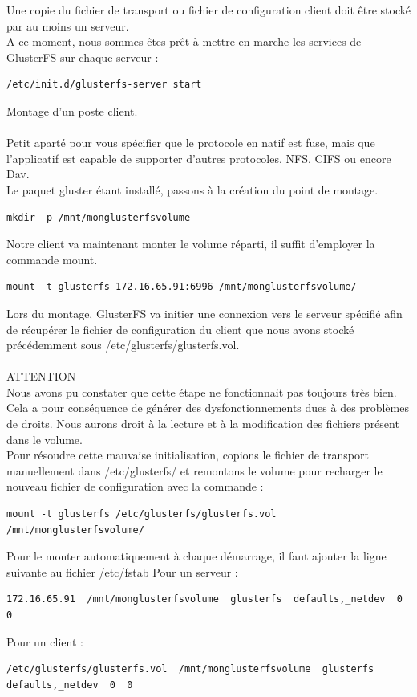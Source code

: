 \documentclass[12pt]{report}
\begin{document}
Une copie du fichier de transport ou fichier de configuration client doit être stocké par au moins un serveur.\\
A ce moment, nous sommes êtes prêt à mettre en marche les services de GlusterFS sur chaque serveur :
\begin{lstlisting}
/etc/init.d/glusterfs-server start
	  \end{lstlisting}
Montage d'un poste client.\\\\
Petit aparté pour vous spécifier que le protocole en natif est fuse, mais que l'applicatif est capable de supporter d'autres protocoles, NFS, CIFS ou encore Dav.\\
Le paquet gluster étant installé, passons à la création du point de montage.
\begin{lstlisting}
mkdir -p /mnt/monglusterfsvolume
	  \end{lstlisting}
Notre client va maintenant monter le volume réparti, il suffit d'employer la commande mount.
\begin{lstlisting}
mount -t glusterfs 172.16.65.91:6996 /mnt/monglusterfsvolume/
	  \end{lstlisting}
Lors du montage, GlusterFS va initier une connexion vers le serveur spécifié afin de récupérer le fichier de configuration du client que nous avons stocké précédemment sous /etc/glusterfs/glusterfs.vol.\\\\
ATTENTION\\
Nous avons pu constater que cette étape ne fonctionnait pas toujours très bien. Cela a pour conséquence de générer des dysfonctionnements dues à des problèmes de droits. Nous aurons droit à la lecture et à la modification des fichiers présent dans le volume.\\
Pour résoudre cette mauvaise initialisation, copions le fichier de transport manuellement dans /etc/glusterfs/ et remontons le volume pour recharger le nouveau fichier de configuration avec la commande :
\begin{lstlisting}
mount -t glusterfs /etc/glusterfs/glusterfs.vol /mnt/monglusterfsvolume/
	  \end{lstlisting}
Pour le monter automatiquement à chaque démarrage, il faut ajouter la ligne suivante au fichier /etc/fstab
Pour un serveur :
\begin{lstlisting}
172.16.65.91  /mnt/monglusterfsvolume  glusterfs  defaults,_netdev  0  0
	  \end{lstlisting}
Pour un client :
\begin{lstlisting}
/etc/glusterfs/glusterfs.vol  /mnt/monglusterfsvolume  glusterfs  defaults,_netdev  0  0
	  \end{lstlisting}
\end{document}
